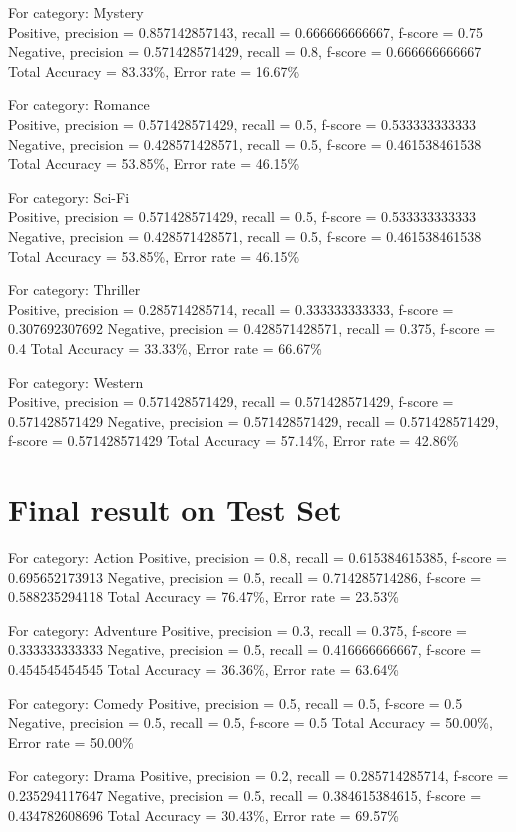\documentclass{article}
\begin{document}
For category: Mystery ~\\
Positive, precision = 0.857142857143, recall = 0.666666666667, f-score = 0.75 
Negative, precision = 0.571428571429, recall = 0.8, f-score = 0.666666666667 
Total Accuracy = 83.33\%, Error rate = 16.67\%

For category: Romance ~\\
Positive, precision = 0.571428571429, recall = 0.5, f-score = 0.533333333333 
Negative, precision = 0.428571428571, recall = 0.5, f-score = 0.461538461538 
Total Accuracy = 53.85\%, Error rate = 46.15\%

For category: Sci-Fi ~\\
Positive, precision = 0.571428571429, recall = 0.5, f-score = 0.533333333333 
Negative, precision = 0.428571428571, recall = 0.5, f-score = 0.461538461538 
Total Accuracy = 53.85\%, Error rate = 46.15\%

For category: Thriller ~\\
Positive, precision = 0.285714285714, recall = 0.333333333333, f-score = 0.307692307692 
Negative, precision = 0.428571428571, recall = 0.375, f-score = 0.4 
Total Accuracy = 33.33\%, Error rate = 66.67\%

For category: Western ~\\
Positive, precision = 0.571428571429, recall = 0.571428571429, f-score = 0.571428571429 
Negative, precision = 0.571428571429, recall = 0.571428571429, f-score = 0.571428571429 
Total Accuracy = 57.14\%, Error rate = 42.86\%

\section{Final result on Test Set}

For category: Action
Positive, precision = 0.8, recall = 0.615384615385, f-score = 0.695652173913 
Negative, precision = 0.5, recall = 0.714285714286, f-score = 0.588235294118 
Total Accuracy = 76.47\%, Error rate = 23.53\%

For category: Adventure
Positive, precision = 0.3, recall = 0.375, f-score = 0.333333333333 
Negative, precision = 0.5, recall = 0.416666666667, f-score = 0.454545454545 
Total Accuracy = 36.36\%, Error rate = 63.64\%

For category: Comedy
Positive, precision = 0.5, recall = 0.5, f-score = 0.5 
Negative, precision = 0.5, recall = 0.5, f-score = 0.5 
Total Accuracy = 50.00\%, Error rate = 50.00\%


For category: Drama
Positive, precision = 0.2, recall = 0.285714285714, f-score = 0.235294117647 
Negative, precision = 0.5, recall = 0.384615384615, f-score = 0.434782608696 
Total Accuracy = 30.43\%, Error rate = 69.57\%
\end{document}
